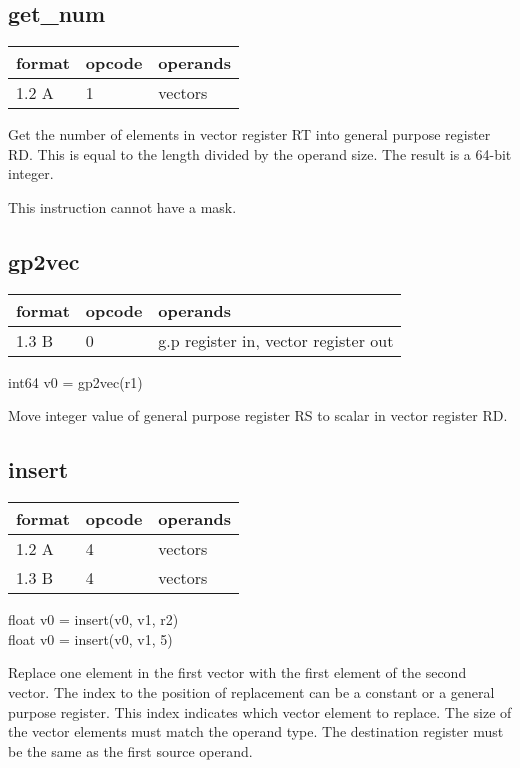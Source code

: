 \documentclass[forwardcom.tex]{subfiles}
\begin{document}
\subsection{get\_num}
\label{table:getNumInstruction}
\begin{tabular}{|p{12mm}|p{15mm}|p{100mm}|}
\hline
\bfseries format & \bfseries opcode & \bfseries operands \\ \hline
1.2 A & 1 & vectors  \\ \hline
\end{tabular}
\vv

Get the number of elements in vector register RT into general purpose register RD. This is equal to the length divided by the operand size. The result is a 64-bit integer.
\vv

This instruction cannot have a mask.

\subsection{gp2vec}
\label{table:gp2vecInstruction}
\begin{tabular}{|p{12mm}|p{15mm}|p{100mm}|}
\hline
\bfseries format & \bfseries opcode & \bfseries operands \\ \hline
1.3 B & 0 & g.p register in, vector register out \\ \hline
\end{tabular}
\vv

int64 v0 = gp2vec(r1)
\vv

Move integer value of general purpose register RS to
scalar in vector register RD.
\vv


\subsection{insert}
\label{table:insertInstruction}
\begin{tabular}{|p{12mm}|p{15mm}|p{100mm}|}
\hline
\bfseries format & \bfseries opcode & \bfseries operands \\ \hline
1.2 A & 4 & vectors \\
1.3 B & 4 & vectors \\ \hline
\end{tabular}
\vv

float v0 = insert(v0, v1, r2) \\
float v0 = insert(v0, v1, 5)
\vv

Replace one element in the first vector with the first element of the second vector. 
The index to the position of replacement can be a constant or a general purpose register. This index indicates which vector element to replace. 
The size of the vector elements must match the operand type. 
The destination register must be the same as the first source operand.
\vv
\end{document}
